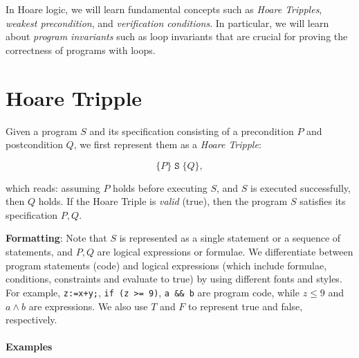 \documentclass[oneside,11pt,dvipsnames]{book}
\newenvironment{commentbox}[1][]{
  \small
  \begin{mybox}
    {\small \textbf{#1}}
  }{
  \end{mybox}
}
\newcommand{\code}[1]{\texttt{#1}}
\begin{document}
In Hoare logic, we will learn fundamental concepts such as \emph{Hoare Tripples}, \emph{weakest precondition}, and \emph{verification conditions}. In particular, we will learn about \emph{program invariants} such as loop invariants that are crucial for proving the correctness of programs with loops.


\section{Hoare Tripple}

Given a program $S$ and its specification consisting of a precondition $P$ and postcondition $Q$, we first represent them as a \emph{Hoare Tripple}:

\begin{center}
\begin{tcolorbox}[colframe=green!50!black, colback=gray!5!white, boxrule=0.5mm, width=0.5\textwidth, sharp corners]
    \[
    \{ P \} \; \code{S} \; \{ Q \}, 
    \]
\end{tcolorbox}
\end{center}

\noindent which reads: assuming $P$ holds before executing $S$, and $S$ is executed successfully, then $Q$  holds.  If the Hoare Triple is \emph{valid} (true), then the program $S$ satisfies its specification $P, Q$. 


\begin{commentbox}{\textbf{Formatting}: }
    Note that $S$ is represented as a single statement or a sequence of statements, and $P, Q$ are logical expressions or formulae.      
    We differentiate between program statements (code) and logical expressions (which include formulae, conditions, constraints and evaluate to true) by using different fonts and styles. For example, \code{z:=x+y;}, \code{if (z >= 9)}, \code{a \&\& b} are program code, while  $z \le 9$ and $a \land b$ are expressions. We also use $T$ and $F$ to represent true and false, respectively.
\end{commentbox}



    
\paragraph{Examples}
\end{document}
